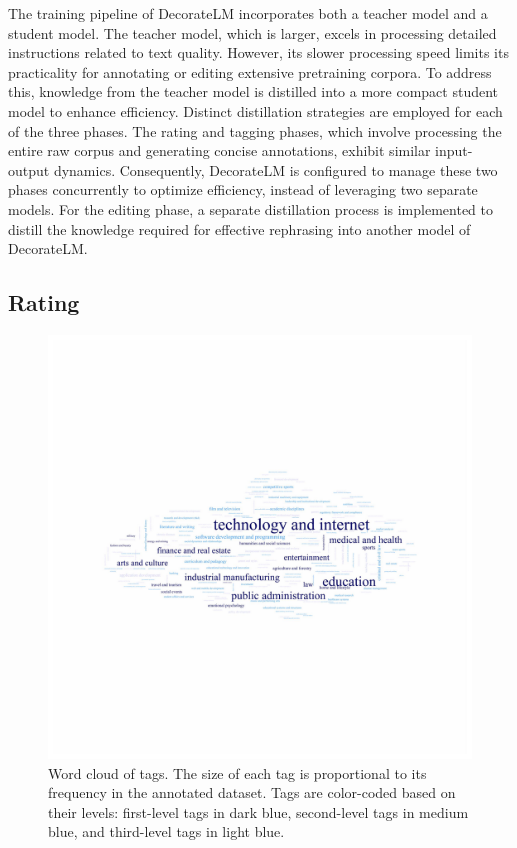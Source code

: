 \documentclass[11pt]{article}
\begin{document}
The training pipeline of DecorateLM incorporates both a teacher model and a student model. The teacher model, which is larger, excels in processing detailed instructions related to text quality. However, its slower processing speed limits its practicality for annotating or editing extensive pretraining corpora. To address this, knowledge from the teacher model is distilled into a more compact student model to enhance efficiency. Distinct distillation strategies are employed for each of the three phases. The rating and tagging phases, which involve processing the entire raw corpus and generating concise annotations, exhibit similar input-output dynamics. Consequently, DecorateLM is configured to manage these two phases concurrently to optimize efficiency, instead of leveraging two separate models. For the editing phase, a separate distillation process is implemented to distill the knowledge required for effective rephrasing into another model of DecorateLM.
\subsection{Rating}
\begin{figure}[t]
    \centering
    \includegraphics[width=\columnwidth]
    {figs/cloud.pdf}
    \caption{Word cloud of tags. The size of each tag is proportional to its frequency in the annotated dataset. Tags are color-coded based on their levels: first-level tags in dark blue, second-level tags in medium blue, and third-level tags in light blue.}
    \label{fig:wordcloud}
\end{figure}
\end{document}
